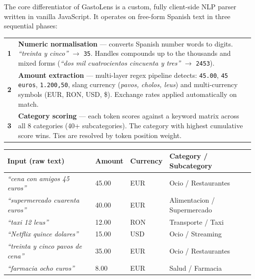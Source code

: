 \documentclass[a4paper,10pt]{article}
\begin{document}
{\small
The core differentiator of GastoLens is a custom, fully client-side NLP
parser written in vanilla JavaScript. It operates on free-form Spanish text
in three sequential phases:
}

\vspace{4pt}

\begin{tcolorbox}[greenbox]
{\small
\begin{tabular}{@{}cp{13.8cm}@{}}
  {\color{ngreen}\bfseries 1} &
    \textbf{\color{tw}Numeric normalisation} ---
    converts Spanish number words to digits.
    \textit{``treinta y cinco''} $\rightarrow$ \texttt{35}.
    Handles compounds up to the thousands and mixed forms
    (\textit{``dos mil cuatrocientos cincuenta y tres''} $\rightarrow$ \texttt{2453}). \\[4pt]
  {\color{ngreen}\bfseries 2} &
    \textbf{\color{tw}Amount extraction} ---
    multi-layer regex pipeline detects: \texttt{45.00},
    \texttt{45 euros}, \texttt{1.200,50},
    slang currency (\textit{pavos, cholos, leus}) and
    multi-currency symbols (EUR, RON, USD, \$).
    Exchange rates applied automatically on match. \\[4pt]
  {\color{ngreen}\bfseries 3} &
    \textbf{\color{tw}Category scoring} ---
    each token scores against a keyword matrix across all 8 categories
    (40+ subcategories). The category with highest cumulative score wins.
    Ties are resolved by token position weight. \\
\end{tabular}
}
\end{tcolorbox}

\vspace{4pt}

\begin{tcolorbox}[databox]
{\footnotesize
\begin{tabular}{@{}p{6cm}p{2cm}p{2.2cm}p{4.8cm}@{}}
  \toprule
  {\color{ncyan}Input (raw text)} &
  {\color{ncyan}Amount} &
  {\color{ncyan}Currency} &
  {\color{ncyan}Category / Subcategory} \\
  \midrule
  \textit{``cena con amigos 45 euros''}       & 45.00 & EUR & Ocio / Restaurantes \\
  \textit{``supermercado cuarenta euros''}    & 40.00 & EUR & Alimentacion / Supermercado \\
  \textit{``taxi 12 leus''}                   & 12.00 & RON & Transporte / Taxi \\
  \textit{``Netflix quince dolares''}         & 15.00 & USD & Ocio / Streaming \\
  \textit{``treinta y cinco pavos de cena''}  & 35.00 & EUR & Ocio / Restaurantes \\
  \textit{``farmacia ocho euros''}            & 8.00  & EUR & Salud / Farmacia \\
  \bottomrule
\end{tabular}
}
\end{tcolorbox}
\end{document}
